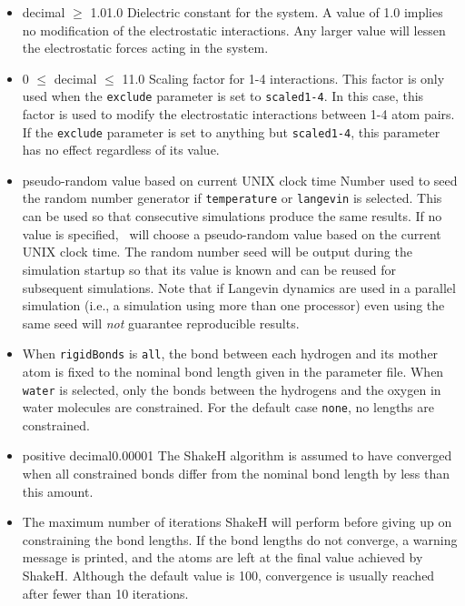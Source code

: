 \begin{itemize}
\item
{}
{decimal $\geq$ 1.0}{1.0}
{Dielectric constant for the system.  A value of 1.0 implies no modification
of the electrostatic interactions.  Any larger value will lessen the
electrostatic forces acting in the system.}

\item
{}
{0 $\leq$ decimal $\leq$ 1}{1.0}
{Scaling factor for 1-4 interactions.  This factor is only used when the
{\tt exclude} parameter is set to {\tt scaled1-4}.  In this case, this
factor is used to modify the electrostatic interactions between 1-4 atom
pairs.  If the {\tt exclude} parameter is set to anything but 
{\tt scaled1-4}, this parameter has no effect regardless of its value.}

\item
{}
{pseudo-random value based on current UNIX clock time}
{Number used to seed the random number generator 
if {\tt temperature} or {\tt langevin} is selected.  This can be
used so that consecutive simulations produce the same results.
If no value is specified, \NAMD\ will choose a pseudo-random
value based on the current UNIX clock time.  The random number
seed will be output during the simulation startup so that
its value is known and can be reused for subsequent simulations.
Note that if Langevin dynamics are used in a parallel simulation 
(i.e., a simulation using more than one processor) 
even using the same seed will {\it not} guarantee reproducible results.
}

\item
{} 
{When {\tt rigidBonds} is {\tt all}, the bond between each hydrogen
and its mother atom is fixed to the nominal bond length given in the
parameter file.  When {\tt water} is selected, only the bonds between
the hydrogens and the oxygen in water molecules are constrained.  
For the default case {\tt none}, no lengths are constrained.
}

\item
{}
{positive decimal}{0.00001}
{
The ShakeH algorithm is assumed to have converged when all constrained
bonds differ from the nominal bond length by less than this amount.
}

\item
{}
{
The maximum number of iterations ShakeH will perform before giving up
on constraining the bond lengths.  If the bond lengths do not
converge, a warning message is printed, and the atoms are left at the
final value achieved by ShakeH.  
Although the default value is 100, 
convergence is usually reached after fewer than 10 iterations.
}

\end{itemize}

